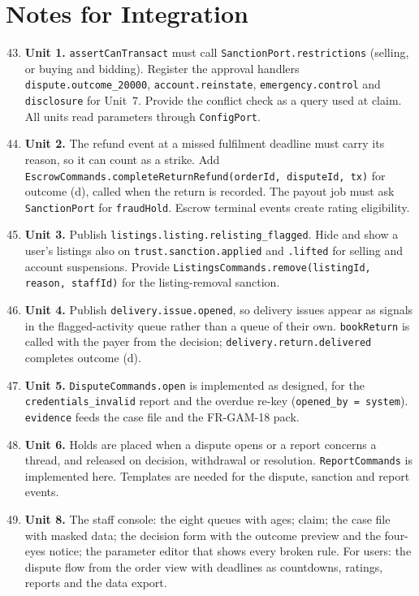 \documentclass[11pt,a4paper]{article}
\begin{document}
\section{Notes for Integration}
\label{sec:notes}
\begin{enumerate}[label=\textbf{I-\arabic*}, leftmargin=*, nosep]
  \setcounter{enumi}{42}
  \item \textbf{Unit 1.} \texttt{assertCanTransact} must call \texttt{SanctionPort.restrictions} (selling, or buying and bidding). Register the approval handlers \texttt{dispute.outcome\_20000}, \texttt{account.reinstate}, \texttt{emergency.control} and \texttt{disclosure} for Unit~7. Provide the conflict check as a query used at claim. All units read parameters through \texttt{ConfigPort}.
  \item \textbf{Unit 2.} The refund event at a missed fulfilment deadline must carry its reason, so it can count as a strike. Add \texttt{EscrowCommands.completeReturnRefund(orderId, disputeId, tx)} for outcome (d), called when the return is recorded. The payout job must ask \texttt{SanctionPort} for \texttt{fraudHold}. Escrow terminal events create rating eligibility.
  \item \textbf{Unit 3.} Publish \texttt{listings.listing.relisting\_flagged}. Hide and show a user's listings also on \texttt{trust.sanction.applied} and \texttt{.lifted} for selling and account suspensions. Provide \texttt{ListingsCommands.remove(listingId, reason, staffId)} for the listing-removal sanction.
  \item \textbf{Unit 4.} Publish \texttt{delivery.issue.opened}, so delivery issues appear as signals in the flagged-activity queue rather than a queue of their own. \texttt{bookReturn} is called with the payer from the decision; \texttt{delivery.return.delivered} completes outcome (d).
  \item \textbf{Unit 5.} \texttt{DisputeCommands.open} is implemented as designed, for the \texttt{credentials\_invalid} report and the overdue re-key (\texttt{opened\_by = system}). \texttt{evidence} feeds the case file and the FR-GAM-18 pack.
  \item \textbf{Unit 6.} Holds are placed when a dispute opens or a report concerns a thread, and released on decision, withdrawal or resolution. \texttt{ReportCommands} is implemented here. Templates are needed for the dispute, sanction and report events.
  \item \textbf{Unit 8.} The staff console: the eight queues with ages; claim; the case file with masked data; the decision form with the outcome preview and the four-eyes notice; the parameter editor that shows every broken rule. For users: the dispute flow from the order view with deadlines as countdowns, ratings, reports and the data export.

\end{enumerate}
\end{document}

